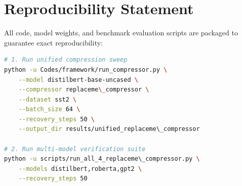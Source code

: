 \section{Reproducibility Statement}
All code, model weights, and benchmark evaluation scripts are packaged to guarantee exact reproducibility:
\begin{lstlisting}[language=bash]
# 1. Run unified compression sweep
python -u Codes/framework/run_compressor.py \
    --model distilbert-base-uncased \
    --compressor replaceme\_compressor \
    --dataset sst2 \
    --batch_size 64 \
    --recovery_steps 50 \
    --output_dir results/unified_replaceme\_compressor

# 2. Run multi-model verification suite
python -u scripts/run_all_4_replaceme\_compressor.py \
    --models distilbert,roberta,gpt2 \
    --recovery_steps 50
\end{lstlisting}

